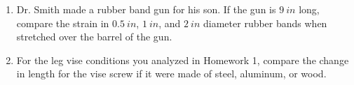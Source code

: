 \documentclass[12pt, oneside]{article}
\let\US\SI
\begin{document}
\begin{enumerate}
	\item %
		Dr. Smith made a rubber band gun for his son.
		If the gun is $\US{9}{in}$ long, compare the strain in $\US{0.5}{in}$,  $\US{1}{in}$, and $\US{2}{in}$ diameter rubber bands when stretched over the barrel of the gun.  

	\item %
		For the leg vise conditions you analyzed in Homework 1, compare the change in length for the vise screw if it were made of steel, aluminum, or wood.

\end{enumerate}
\end{document}
